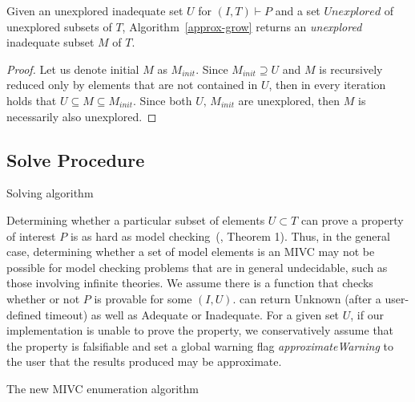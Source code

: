 \begin{proposition}
Given an unexplored inadequate set $U$ for $(I,T) \vdash P$ and a set $\mathit{Unexplored}$ of unexplored subsets of $T$, Algorithm~\ref{approx-grow} returns an \emph{unexplored} inadequate subset $M$ of $T$.
\end{proposition}

\begin{proof}
Let us denote initial $M$ as $M_{init}$. Since $M_{init} \supseteq U$ and $M$ is recursively reduced only by elements that are not contained in $U$, then in every iteration holds that $U \subseteq M \subseteq M_{init}$. Since both $U, \, M_{init}$ are unexplored, then $M$ is necessarily also unexplored.
\end{proof}

\subsection{Solve Procedure}

\begin{algorithm}[t]
\begin{small}

\caption{Solving algorithm}
\label{alg:solve}
\end{small}
\end{algorithm}

Determining whether a particular subset of elements $U \subset T$ can prove a property of interest $P$ is as hard as model checking~(\cite{Ghass16}, Theorem 1).  Thus, in the general case, determining whether a set of model elements is an MIVC may not be possible for model checking problems that are in general undecidable, such as those involving infinite theories.  We assume there is a function \CheckAdq that checks
whether or not $P$ is provable for some $(I, U)$.  \CheckAdq can return {\sc Unknown}
(after a user-defined timeout) as well as {\sc Adequate}
or {\sc Inadequate}.  For a given set $U$, if our implementation is
unable to prove the property, we conservatively assume that
the property is falsifiable and set a global warning flag {\em approximateWarning} to the
user that the results produced may be approximate.

%


\begin{algorithm}[H]
\begin{small}

\caption{The new MIVC enumeration algorithm}
\label{alg:allmivc}
\end{small}
\end{algorithm}



